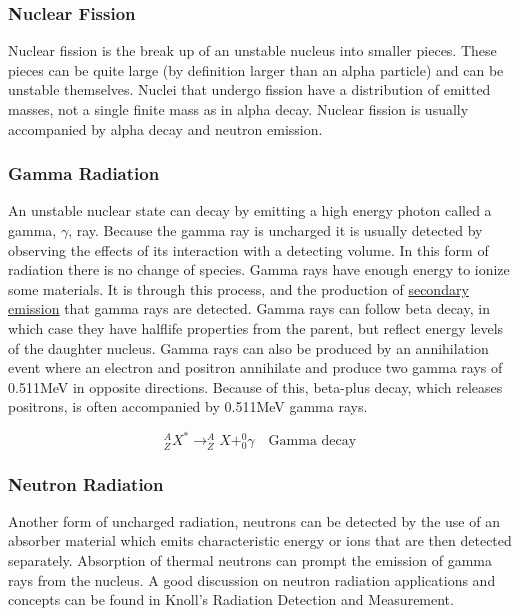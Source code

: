 \documentclass[12pt]{article}
\begin{document}
\begin{doublespacing}

\subsubsection{Nuclear Fission}
Nuclear fission is the break up of an unstable nucleus into smaller pieces. These pieces can be quite large (by definition larger than an alpha particle) and can be unstable themselves. Nuclei that undergo fission have a distribution of emitted masses, not a single finite mass as in alpha decay. Nuclear fission is usually accompanied by alpha decay and neutron emission.

\subsubsection{Gamma Radiation}
An unstable nuclear state can decay by emitting a high energy photon called a gamma, $\gamma$, ray. Because the gamma ray is uncharged it is usually detected by observing the effects of its interaction with a detecting volume. In this form of radiation there is no change of species. 
Gamma rays have enough energy to ionize some materials. It is through this process, and the production of \href{https://en.wikipedia.org/wiki/Secondary_emmission}{secondary emission} that gamma rays are detected. Gamma rays can follow beta decay, in which case they have halflife properties from the parent, but reflect energy levels of the daughter nucleus.
Gamma rays can also be produced by an annihilation event where an electron and positron annihilate and produce two gamma rays of 0.511MeV in opposite directions. Because of this, beta-plus decay, which releases positrons, is often accompanied by 0.511MeV gamma rays.

\begin{equation} \label{gammaDecayEqn}
^A_Z X^* \rightarrow ^{A}_{Z}X + ^0_0\gamma \quad \mbox{Gamma decay}
\end{equation}


\subsubsection{Neutron Radiation}
Another form of uncharged radiation, neutrons can be detected by the use of an absorber material which emits characteristic energy or ions that are then detected separately.
Absorption of thermal neutrons can prompt the emission of gamma rays from the nucleus.
A good discussion on neutron radiation applications and concepts can be found in Knoll's Radiation Detection and Measurement.


\end{doublespacing}
\end{document}
